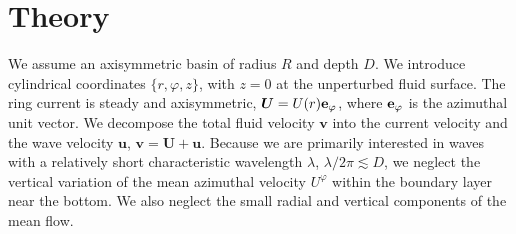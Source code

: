 \documentclass[aps,twocolumn]{revtex4-2}
\begin{document}
\section{Theory}
\label{sec:theory}

We assume an axisymmetric basin of radius $R$ and depth $D$. We introduce cylindrical coordinates $\{r,\varphi,z\}$, with $z=0$ at the unperturbed fluid surface. The ring current is steady and axisymmetric, ${\bm U} = U(r) {\textbf e}_\varphi$, where ${\textbf e}_\varphi$ is the azimuthal unit vector. We decompose the total fluid velocity ${\bm v}$ into the current velocity and the wave velocity ${\bm u}$, ${\bm v} = {\bm U}+{\bm u}$. Because we are primarily interested in waves with a relatively short characteristic wavelength $\lambda$, $\lambda/2\pi \lesssim D$, we neglect the vertical variation of the mean azimuthal velocity $U^\varphi$ within the boundary layer near the bottom. We also neglect the small radial and vertical components of the mean flow.
\end{document}
